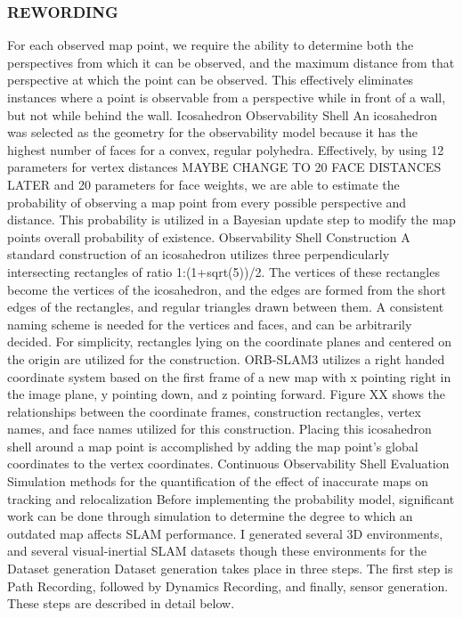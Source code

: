 \subsubsection{REWORDING}

For each observed map point, we require the ability to determine both the perspectives from which it can be observed, and the maximum distance from that perspective at which the point can be observed. This effectively eliminates instances where a point is observable from a perspective while in front of a wall, but not while behind the wall.
Icosahedron Observability Shell
An icosahedron was selected as the geometry for the observability model because it has the highest number of faces for a convex, regular polyhedra. Effectively, by using 12 parameters for vertex distances MAYBE CHANGE TO 20 FACE DISTANCES LATER and 20 parameters for face weights, we are able to estimate the probability of observing a map point from every possible perspective and distance. This probability is utilized in a Bayesian update step to modify the map points overall probability of existence.
Observability Shell Construction
A standard construction of an icosahedron utilizes three perpendicularly intersecting rectangles of ratio 1:(1+sqrt(5))/2. The vertices of these rectangles become the vertices of the icosahedron, and the edges are formed from the short edges of the rectangles, and regular triangles drawn between them. A consistent naming scheme is needed for the vertices and faces, and can be arbitrarily decided. For simplicity, rectangles lying on the coordinate planes and centered on the origin are utilized for the construction. ORB-SLAM3 utilizes a right handed coordinate system based on the first frame of a new map with x pointing right in the image plane, y pointing down, and z pointing forward. Figure XX shows the relationships between the coordinate frames, construction rectangles, vertex names, and face names utilized for this construction. Placing this icosahedron shell around a map point is accomplished by adding the map point’s global coordinates to the vertex coordinates.
Continuous Observability Shell
Evaluation
Simulation methods for the quantification of the effect of inaccurate maps on tracking and relocalization
Before implementing the probability model, significant work can be done through simulation to determine the degree to which an outdated map affects SLAM performance. I generated several 3D environments, and several visual-inertial SLAM datasets though these environments for the
Dataset generation
Dataset generation takes place in three steps. The first step is Path Recording, followed by Dynamics Recording, and finally, sensor generation. These steps are described in detail below.
